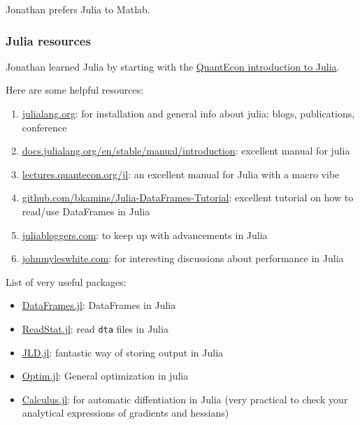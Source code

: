 Jonathan prefers Julia to Matlab.

\subsubsection{Julia resources}
Jonathan learned Julia by starting with the \href{https://lectures.quantecon.org/jl/index_learning_julia.html}{QuantEcon introduction to Julia}.

Here are some helpful resources:
\begin{enumerate}
\item \href{https://julialang.org}{julialang.org}: for installation and general info about julia: blogs, publications, conference
\item \href{https://docs.julialang.org/en/stable/manual/introduction/}{docs.julialang.org/en/stable/manual/introduction}: excellent manual for julia
\item \href{https://lectures.quantecon.org/jl/}{lectures.quantecon.org/jl}: an excellent manual for Julia with a macro vibe
\item \href{https://github.com/bkamins/Julia-DataFrames-Tutorial}{github.com/bkamins/Julia-DataFrames-Tutorial}: excellent tutorial on how to read/use DataFrames in Julia
\item \href{https://www.juliabloggers.com/}{juliabloggers.com}: to keep up with advancements in Julia
\item \href{http://www.johnmyleswhite.com/}{johnmyleswhite.com}: for interesting discussions about performance in Julia 
\end{enumerate}

List of very useful packages:
\begin{itemize}
\item \href{https://github.com/JuliaData/DataFrames.jl}{DataFrames.jl}: DataFrames in Julia
\item \href{https://github.com/davidanthoff/ReadStat.jl}{ReadStat.jl}: read \texttt{dta} files in Julia
\item \href{https://github.com/JuliaIO/JLD.jl}{JLD.jl}: fantastic way of storing output in Julia
\item \href{https://github.com/JuliaNLSolvers/Optim.jl}{Optim.jl}: General optimization in julia
\item \href{https://github.com/johnmyleswhite/Calculus.jl}{Calculus.jl}: for automatic diffentiation in Julia (very practical to check your analytical expressions of gradients and hessians)
\end{itemize}

